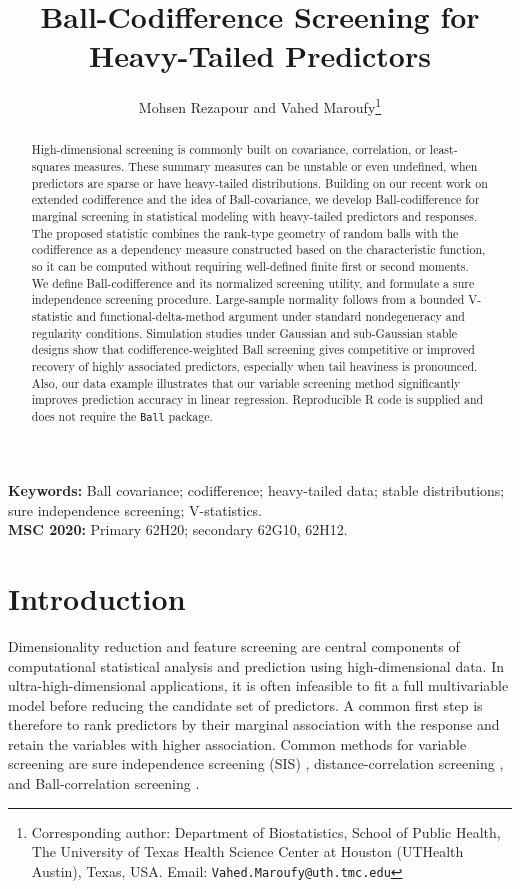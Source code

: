 \documentclass[11pt]{article}
\title{Ball-Codifference Screening for Heavy-Tailed Predictors}
\author{
Mohsen Rezapour\hspace{.5cm} and  \hspace{.5cm}
Vahed Maroufy\thanks{Corresponding author:
Department of Biostatistics, School of Public Health,
The University of Texas Health Science Center at Houston (UTHealth Austin),
Texas, USA.
Email: \texttt{Vahed.Maroufy@uth.tmc.edu}}
}
\date{}
\theoremstyle{definition}
\begin{document}
\maketitle


\begin{abstract}
High-dimensional screening is commonly built on covariance, correlation, or least-squares measures.  These summary measures can be unstable or even undefined, when predictors are sparse or have heavy-tailed distributions. Building on our recent work on extended codifference 
and the idea of Ball-covariance, we develop Ball-codifference for marginal screening in statistical modeling with heavy-tailed predictors and responses.  The proposed statistic combines the rank-type geometry of random balls with the codifference as a dependency measure constructed based on the characteristic function, so it can be computed without requiring well-defined finite first or second moments.  
We define Ball-codifference and its normalized screening utility, and formulate a sure independence screening procedure.  Large-sample normality follows from a bounded V-statistic and functional-delta-method argument under standard nondegeneracy and regularity conditions.  Simulation studies under Gaussian and sub-Gaussian stable designs show that codifference-weighted Ball screening gives competitive or improved recovery of highly associated predictors, especially when tail heaviness is pronounced. Also, our data example illustrates that our variable screening method significantly improves prediction accuracy in linear regression. Reproducible R code is supplied and does not require the \texttt{Ball} package.
\end{abstract}


\noindent\textbf{Keywords:} Ball covariance; codifference; heavy-tailed data; stable distributions; sure independence screening; V-statistics.\\
\textbf{MSC 2020:} Primary 62H20; secondary 62G10, 62H12.

\section{Introduction}\label{sec:intro}

Dimensionality reduction and feature screening are central components of computational statistical analysis and prediction using high-dimensional data.  In ultra-high-dimensional applications, it is often infeasible to fit a full multivariable model before reducing the candidate set of predictors.  A common first step is therefore to rank predictors by their marginal association with the response and retain the variables with higher association.  Common methods for variable screening are sure independence screening (SIS) \citep{Fan:Lv}, distance-correlation screening \citep{Li:Zhong:Zhu:2012}, and Ball-correlation screening \citep{Pan:2019}.
\end{document}
